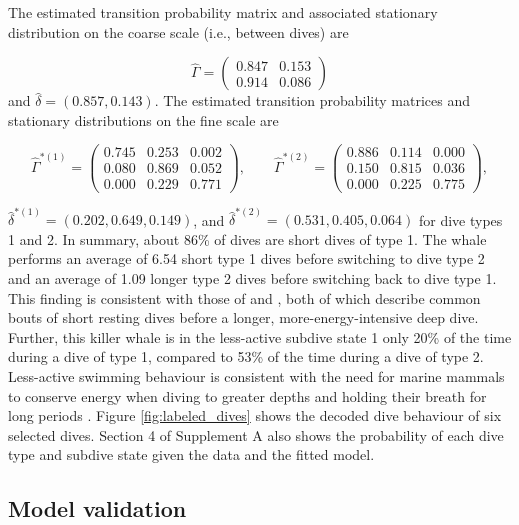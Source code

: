 The estimated transition probability matrix and associated stationary distribution on the coarse scale (i.e., between dives) are

\[\hat \Gamma = \begin{pmatrix} 
0.847 & 0.153 \\
0.914 & 0.086
\end{pmatrix}\]
%
and $\hat \delta = \left(0.857, 0.143 \right)$. The estimated transition probability matrices and stationary distributions on the fine scale are 

\[\hat \Gamma^{*(1)} = \begin{pmatrix} 
0.745 & 0.253 & 0.002 \\
0.080 & 0.869 & 0.052 \\
0.000 & 0.229 & 0.771
\end{pmatrix}, \qquad 
\hat \Gamma^{*(2)} = \begin{pmatrix} 
0.886 & 0.114 & 0.000 \\
0.150 & 0.815 & 0.036 \\
0.000 & 0.225 & 0.775
\end{pmatrix},\]

$\hat \delta^{*(1)} = \left(0.202, 0.649, 0.149\right)$, and $\hat \delta^{*(2)} = \left( 0.531, 0.405, 0.064 \right)$ for dive types 1 and 2.
In summary, about 86\% of dives are short dives of type 1. The whale performs an average of 6.54 short type 1 dives before switching to dive type 2 and an average of 1.09 longer type 2 dives before switching back to dive type 1. This finding is consistent with those of \citet{Tennessen:2019b} and \citet{Williams:2009}, both of which describe common bouts of short resting dives before a longer, more-energy-intensive deep dive.
Further, this killer whale is in the less-active subdive state 1 only 20\% of the time during a dive of type 1, compared to 53\% of the time during a dive of type 2. Less-active swimming behaviour is consistent with the need for marine mammals to conserve energy when diving to greater depths and holding their breath for long periods \citep{Williams:1999,Hastie:2006}. Figure \ref{fig:labeled_dives} shows the decoded dive behaviour of six selected dives. Section 4 of Supplement A also shows the probability of each dive type and subdive state given the data and the fitted model.

\subsection{Model validation}
\label{subsec:model_validation}

